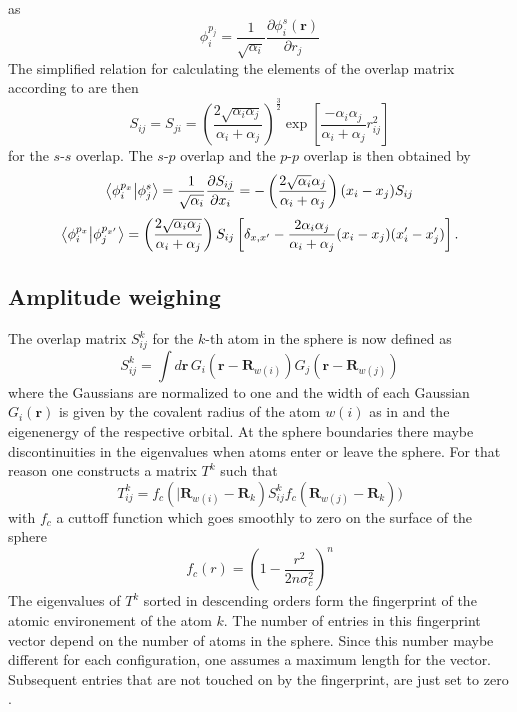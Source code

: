as
\begin{equation}\phi_i^{p_j}=\frac{1}{\sqrt{\alpha_i}}\frac{\partial\phi_i^s(\mathbf{r})}{\partial r_j}\end{equation}
The simplified relation for calculating the elements of the overlap matrix according to \citeauthor{Clementi1966} \cite{Clementi1966} are then
\begin{equation}
\label{ovrlap}
S_{ij}=S_{ji}=\left(\frac{2\sqrt{\alpha_i\alpha_j}}{\alpha_i+\alpha_j}\right)^\frac{3}{2}\exp\left[\frac{-\alpha_i\alpha_j}{\alpha_i+\alpha_j}r_{ij}^2\right]\end{equation}
for the $s$-$s$ overlap. The $s$-$p$ overlap and the $p$-$p$ overlap is then obtained by
\begin{equation}\bra{\phi_i^{p_x}}\ket{\phi_j^s}=\\ \frac{1}{\sqrt{\alpha_i}}\frac{\partial S_{ij}}{\partial x_i}=-\left(\frac{2\sqrt{\alpha_i}\alpha_j}{\alpha_i+\alpha_j}\right)(x_i-x_j)S_{ij}\end{equation}
\begin{equation}\bra{\phi_i^{p_x}}\ket{\phi_j^{p_{x'}}}=\left(\frac{2\sqrt{\alpha_i\alpha_j}}{\alpha_i+\alpha_j}\right)S_{ij}\left[\delta_{x,x'}-\frac{2\alpha_i\alpha_j}{\alpha_i+\alpha_j}(x_i-x_j)(x'_i-x'_j)\right].\end{equation}

\subsection{Amplitude weighing}
The overlap matrix $S^k_{ij}$ for the $k$-th atom in the sphere is now defined as
\begin{equation}S^k_{ij}=\int d\mathbf{r}\, G_i(\mathbf{r}-\mathbf{R}_{w(i)})G_j(\mathbf{r}-\mathbf{R}_{w(j)})\end{equation}
where the Gaussians are normalized to one and the width of each Gaussian $G_i(\mathbf{r})$ is given by the covalent radius of the atom $w(i)$ as in \cite{Zhu2016} and the eigenenergy of the respective orbital. At the sphere boundaries there maybe discontinuities in the eigenvalues when atoms enter or leave the sphere. For that reason one constructs a matrix $T^k$ such that
\begin{equation}T^k_{ij}=f_c(|\mathbf{R}_{w(i)}-\mathbf{R}_k)S^k_{ij}f_c(\mathbf{R}_{w(j)}-\mathbf{R}_k))\end{equation}
with $f_c$ a cuttoff function which goes smoothly to zero on the surface of the sphere
\begin{equation}f_c(r)=\left(1-\frac{r^2}{2n\sigma_c^2}\right)^n\end{equation}
The eigenvalues of $T^k$ sorted in descending orders form the fingerprint of the atomic environement of the atom $k$. The number of entries in this fingerprint vector depend on the number of atoms in the sphere. Since this number maybe different for each configuration, one assumes a maximum length for the vector. Subsequent entries that are not touched on by the fingerprint, are just set to zero \cite{Zhu2016}.
